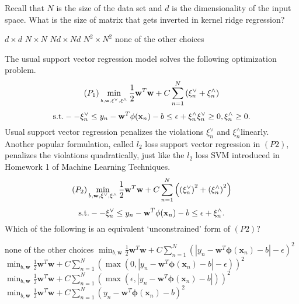 \documentclass[a4paper,10pt]{exam}
\begin{document}
\begin{questions}
	\question Recall that $N$ is the size of the data set and $d$ is the dimensionality of the input space. What is the size of matrix that gets inverted in kernel ridge regression?
	\begin{checkboxes}
		\choice $d \times d$
		\CorrectChoice $N \times N$
		\choice $Nd \times Nd$
		\choice $N^2 \times N^2$
		\choice none of the other choices\\
	\end{checkboxes}

	\question The usual support vector regression model solves the following optimization problem.
	\[({P_1})\mathop {\min }\limits_{_{b,{\bf{w}},{{\bf{\xi }}^ \vee },{{\bf{\xi }}^ \wedge }}} \frac{1}{2}{{\bf{w}}^T}{\bf{w}} + C\sum\limits_{n = 1}^N {\left( {\xi _n^ \vee  + \xi _n^ \wedge } \right)}\]\[ {\rm{  s}}.{\rm{t}}. -  - \xi _n^ \vee  \le {y_n} - {{\bf{w}}^T}\phi ({{\bf{x}}_n}) - b \le \epsilon + \xi _n^ \wedge \xi _n^ \vee  \ge 0,\xi _n^ \wedge  \ge 0.\]
	Usual support vector regression penalizes the violations $\xi^\vee_n$ and $\xi^\wedge_n$linearly. Another popular formulation, called $l_2$ loss support vector regression in $(P2)$, penalizes the violations quadratically, just like the $l_2$ loss SVM introduced in Homework 1 of Machine Learning Techniques.
	\[({P_2})\mathop {\min }\limits_{b,{\bf{w}},{{\bf{\xi }}^ \vee },{{\bf{\xi }}^ \wedge }} \frac{1}{2}{{\bf{w}}^T}{\bf{w}} + C\sum\limits_{n = 1}^N {\left( {{{(\xi _n^ \vee )}^2} + {{(\xi _n^ \wedge )}^2}} \right)} \]
	\[{\rm{s}}.{\rm{t}}. -  - \xi _n^ \vee  \le {y_n} - {{\bf{w}}^T}\phi ({{\bf{x}}_n}) - b \le \epsilon  + \xi _n^ \wedge .\]
	Which of the following is an equivalent `unconstrained' form of $(P2)$?

	\begin{checkboxes}
		\choice none of the other choices
		\choice $\min_{b, \mathbf{w}} \frac{1}{2} \mathbf{w}^T \mathbf{w} + C \sum_{n=1}^N (|y_n - \mathbf{w}^T \mathbf{\phi}(\mathbf{x}_n) - b| - \epsilon)^2$
		\CorrectChoice $\min_{b, \mathbf{w}} \frac{1}{2} \mathbf{w}^T \mathbf{w} + C \sum_{n=1}^N (\max(0, |y_n - \mathbf{w}^T \mathbf{\phi}(\mathbf{x}_n) - b| - \epsilon))^2$\
		\choice $\min_{b, \mathbf{w}} \frac{1}{2} \mathbf{w}^T \mathbf{w} + C \sum_{n=1}^N (\max(\epsilon, |y_n - \mathbf{w}^T \mathbf{\phi}(\mathbf{x}_n) - b|    ))^2$
		\choice $\min_{b, \mathbf{w}} \frac{1}{2} \mathbf{w}^T \mathbf{w} + C \sum_{n=1}^N (y_n - \mathbf{w}^T \mathbf{\phi}(\mathbf{x}_n) - b)^2$\\
	\end{checkboxes}


\end{questions}
\end{document}
